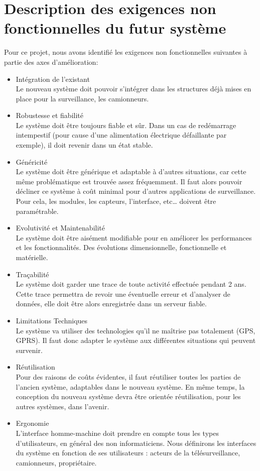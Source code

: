 \section{Description des exigences non fonctionnelles du futur système}

Pour ce projet, nous avons identifié les exigences non fonctionnelles suivantes à partie des axes d’amélioration:

\begin{itemize}

\item Intégration de l’existant \\
Le nouveau système doit pouvoir s’intégrer dans les structures déjà mises en place pour la surveillance, les camionneurs.

\item Robustesse et fiabilité \\
Le système doit être toujours fiable et sûr. Dans un cas de redémarrage intempestif (pour cause d’une alimentation électrique défaillante par exemple), il doit revenir dans un état stable.

\item Généricité \\
Le système doit être générique et adaptable à d’autres situations, car cette même problématique est trouvée assez fréquemment. Il faut alors pouvoir décliner ce système à coût minimal pour d’autres applications de surveillance. Pour cela, les modules, les capteurs, l’interface, etc… doivent être paramétrable.

\item Evolutivité et Maintenabilité \\
Le système doit être aisément modifiable pour en améliorer les performances et les fonctionnalités. Des évolutions dimensionnelle, fonctionnelle et matérielle.

\item Traçabilité \\
Le système doit garder une trace de toute activité effectuée pendant 2 ans. Cette trace permettra de revoir une éventuelle erreur et d’analyser de données, elle doit être alors enregistrée dans un serveur fiable.

\item Limitations Techniques \\
Le système va utiliser des technologies qu'il ne maîtrise pas totalement (GPS, GPRS). Il faut donc adapter le système aux différentes situations qui peuvent survenir.

\item Réutilisation \\
Pour des raisons de coûts évidentes, il faut réutiliser toutes les parties de l'ancien système, adaptables dans le nouveau système. En même temps, la conception du nouveau système devra être orientée réutilisation, pour les autres systèmes, dans l'avenir.

\item Ergonomie \\
L'interface homme-machine doit prendre en compte tous les types d'utilisateurs, en général des non informaticiens. Nous définirons les interfaces du système en fonction de ses utilisateurs : acteurs de la télésurveillance, camionneurs, propriétaire.

\end{itemize}
